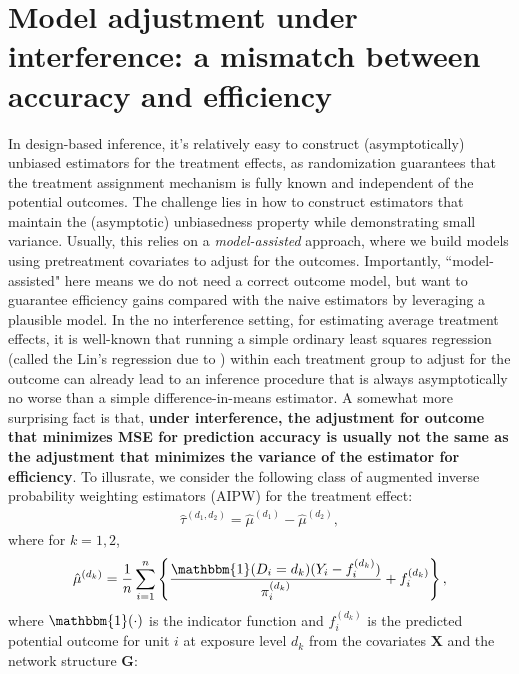 \documentclass{article}
\theoremstyle{plain}
\theoremstyle{definition}
\theoremstyle{remark}
\newcommand{\bG}{\boldsymbol{G}}
\newcommand{\bX}{\boldsymbol{X}}
\newcommand{\indicator}{\mathbbm{1}}
\newcommand{\sumi}{\sum_{i=1}^n}
\begin{document}
\section{Model adjustment under interference: a mismatch between accuracy and efficiency}\label{sec::model_assisted_adjustment} 
In design-based inference, it's relatively easy to construct (asymptotically) unbiased estimators for the treatment effects, as randomization guarantees that the treatment assignment mechanism is fully known and independent of the potential outcomes. The challenge lies in how to construct estimators that maintain the (asymptotic) unbiasedness property while demonstrating small variance. Usually, this relies on a \textit{model-assisted} approach, where we build models using pretreatment covariates to adjust for the outcomes. Importantly, ``model-assisted" here means we do not need a correct outcome model, but want to guarantee efficiency gains compared with the naive estimators by leveraging a plausible model.
In the no interference setting, for estimating average treatment effects, it is well-known that running a simple ordinary least squares regression (called the Lin's regression due to \citet{lin2013agnostic}) within each treatment group to adjust for the outcome can already lead to an inference procedure that is always asymptotically no worse than a simple difference-in-means estimator. A somewhat more surprising fact is that, \textbf{under interference, the adjustment for outcome that minimizes MSE for prediction accuracy is usually not the same as the adjustment that minimizes the variance of the estimator for efficiency}. To illusrate, we consider the following class of augmented inverse probability weighting estimators (AIPW) for the treatment effect: 
\begin{align}\label{eq::aipw}
    \hat\tau^{(d_1,d_2)} = \hat{\mu}^{(d_1)} - \hat{\mu}^{(d_2)},
\end{align}
where for $k=1,2$,
{\small 
\begin{align}\label{eq::aipw_def}
    \hat{\mu}^{(d_k)} = \frac{1}{n}\sumi \left\{ \frac{\indicator(D_i=d_k)(Y_i-f_i^{(d_k)})}{\pi_i^{(d_k)}} + f_i^{(d_k)} \right\},
\end{align}
}
where $\indicator(\cdot)$ is the indicator function and $f_i^{(d_k)}$ is the predicted potential outcome for unit $i$ at exposure level $d_k$ from the covariates $\bX$ and the network structure $\bG$:
\end{document}
